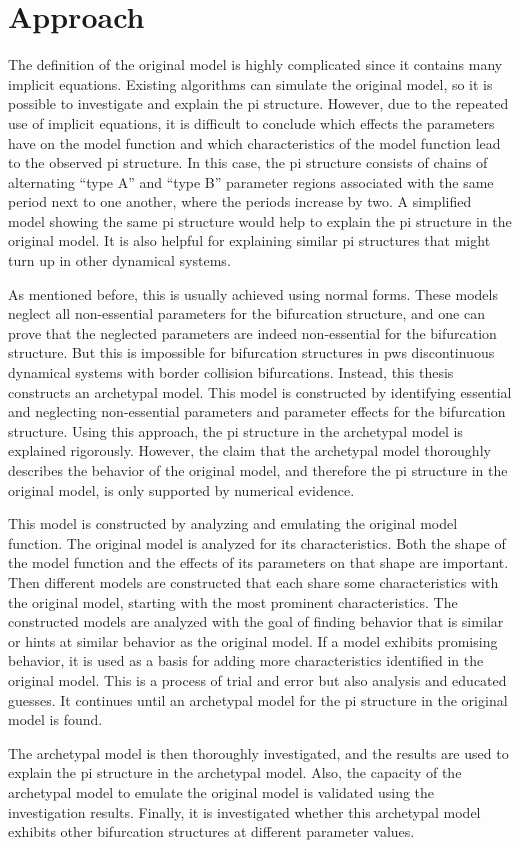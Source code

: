 \chapter{Approach}
\label{chap:approach}

The definition of the original model is highly complicated since it contains many implicit equations.
Existing algorithms can simulate the original model, so it is possible to investigate and explain the \gls{pi} structure.
However, due to the repeated use of implicit equations, it is difficult to conclude which effects the parameters have on the model function and which characteristics of the model function lead to the observed \gls{pi} structure.
In this case, the \gls{pi} structure consists of chains of alternating ``type A'' and ``type B'' parameter regions associated with the same period next to one another, where the periods increase by two.
A simplified model showing the same \gls{pi} structure would help to explain the \gls{pi} structure in the original model.
It is also helpful for explaining similar \gls{pi} structures that might turn up in other dynamical systems.

As mentioned before, this is usually achieved using normal forms.
These models neglect all non-essential parameters for the bifurcation structure, and one can prove that the neglected parameters are indeed non-essential for the bifurcation structure.
But this is impossible for bifurcation structures in \gls{pws} discontinuous dynamical systems with border collision bifurcations.
Instead, this thesis constructs an archetypal model.
This model is constructed by identifying essential and neglecting non-essential parameters and parameter effects for the bifurcation structure.
Using this approach,  the \gls{pi} structure in the archetypal model is explained rigorously.
However, the claim that the archetypal model thoroughly describes the behavior of the original model, and therefore the \gls{pi} structure in the original model, is only supported by numerical evidence.

This model is constructed by analyzing and emulating the original model function.
The original model is analyzed for its characteristics.
Both the shape of the model function and the effects of its parameters on that shape are important.
Then different models are constructed that each share some characteristics with the original model, starting with the most prominent characteristics.
The constructed models are analyzed with the goal of finding behavior that is similar or hints at similar behavior as the original model.
If a model exhibits promising behavior, it is used as a basis for adding more characteristics identified in the original model.
This is a process of trial and error but also analysis and educated guesses.
It continues until an archetypal model for the \gls{pi} structure in the original model is found.


The archetypal model is then thoroughly investigated, and the results are used to explain the \gls{pi} structure in the archetypal model.
Also, the capacity of the archetypal model to emulate the original model is validated using the investigation results.
Finally, it is investigated whether this archetypal model exhibits other bifurcation structures at different parameter values.
